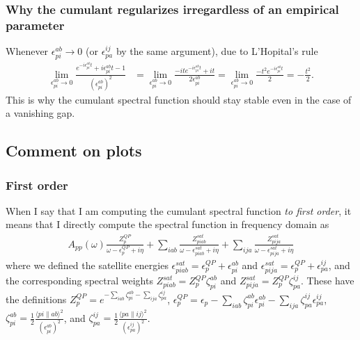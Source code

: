 \subsubsection{Why the cumulant regularizes irregardless of an empirical parameter}
Whenever $\epsilon_{pi}^{ab} \to 0$ (or $\epsilon_{pa}^{ij}$ by the same argument), due to L'Hopital's rule
\begin{align}
\lim_{\epsilon_{pi}^{ab} \to 0} \frac{e^{-i \epsilon_{pi}^{ab} t} +i \epsilon_{pi}^{ab} t -1}{\left(\epsilon_{pi}^{ab}\right)^2} &= \lim_{\epsilon_{pi}^{ab} \to 0} \frac{-i t e^{-i \epsilon_{pi}^{ab} t} + i t}{2 \epsilon_{pi}^{ab}} = \lim_{\epsilon_{pi}^{ab} \to 0} \frac{-t^2 e^{-i \epsilon_{pi}^{ab} t}}{2} = -\frac{t^2}{2}.
\end{align}
This is why the cumulant spectral function should stay stable even in the case of a vanishing gap.
\subsection{Comment on plots}
\subsubsection{First order}
When I say that I am computing the cumulant spectral function \emph{to first order}, it means that I directly compute the spectral function in frequency domain as
\begin{align}
A_{pp}(\omega) \frac{Z_p^{QP}}{\omega - \epsilon_p^{QP} + i\eta} + \sum_{i a b} \frac{Z_{piab}^{sat}}{\omega - \epsilon_{piab}^{sat} + i\eta} + \sum_{i j a} \frac{Z_{pija}^{sat}}{\omega - \epsilon_{pija}^{sat} + i\eta}
\end{align}
where we defined the satellite energies $\epsilon_{piab}^{sat} = \epsilon_p^{QP} + \epsilon_{pi}^{ab}$ and $\epsilon_{pija}^{sat} = \epsilon_p^{QP} + \epsilon_{pa}^{ij}$, and the corresponding spectral weights $Z_{piab}^{sat} = Z_p^{QP} \zeta_{pi}^{ab}$ and $Z_{pija}^{sat} = Z_p^{QP} \zeta_{pa}^{ij}$. These have the definitions $Z_p^{QP} = e^{-\sum_{i a b} \zeta_{pi}^{ab} - \sum_{i j a} \zeta_{pa}^{ij}}$, $\epsilon_p^{QP} = \epsilon_p - \sum_{i a b} \zeta_{pi}^{ab}\epsilon_{pi}^{ab} - \sum_{i j a} \zeta_{pa}^{ij}\epsilon_{pa}^{ij}$, $\zeta_{pi}^{ab} = \frac{1}{2} \frac{\langle p i \| a b\rangle^2}{\left(\epsilon_{p i}^{a b}\right)^2}$, and $\zeta_{pa}^{ij} = \frac{1}{2} \frac{\langle p a \| i j\rangle^2}{\left(\epsilon_{p a}^{i j}\right)^2}$.
